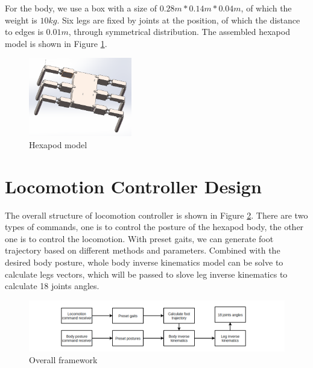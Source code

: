 \documentclass[conference]{IEEEtran}
\begin{document}
For the body, we use a box with a size of \(0.28m * 0.14m *0.04m\), of which the weight is \(10kg\). Six legs are fixed by joints at the position, of which the distance to edges is \(0.01m\), through symmetrical distribution. The assembled hexapod model is shown in Figure \ref{fig10}. 

\begin{figure}
    \centerline{\includegraphics[width=0.4\textwidth]{hexapod.png}}
    \caption{Hexapod model}
    \label{fig10}
\end{figure}

\section{Locomotion Controller Design}\label{s4}

The overall structure of locomotion controller is shown in Figure \ref{fig4}. There are two types of commands, one is to control the posture of the hexapod body, the other one is to control the locomotion. With preset gaits, we can generate foot trajectory based on different methods and parameters. Combined with the desired body posture, whole body inverse kinematics model can be solve to calculate legs vectors, which will be passed to slove leg inverse kinematics to calculate 18 joints angles.

\begin{figure}
    \centerline{\includegraphics[scale = 0.3]{framework.png}}
    \caption{Overall framework}
    \label{fig4}
\end{figure}
\end{document}
